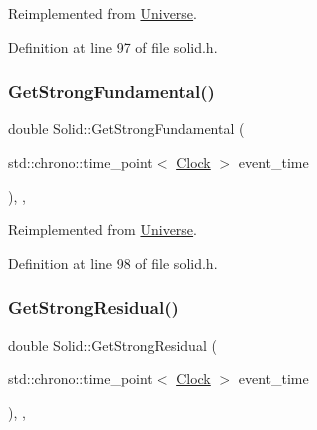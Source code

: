 Reimplemented from \mbox{\hyperlink{class_universe_acb453ce71da418c5b5617fecede9571b}{Universe}}.



Definition at line 97 of file solid.\+h.

\mbox{\label{class_solid_ab3a972354b25ad1bbe8c3f3e7638e24c}} 
\subsubsection{\texorpdfstring{Get\+Strong\+Fundamental()}{GetStrongFundamental()}}
{\footnotesize\ttfamily double Solid\+::\+Get\+Strong\+Fundamental (\begin{DoxyParamCaption}\item[{std\+::chrono\+::time\+\_\+point$<$ \mbox{\hyperlink{universe_8h_a0ef8d951d1ca5ab3cfaf7ab4c7a6fd80}{Clock}} $>$}]{event\+\_\+time }\end{DoxyParamCaption})\hspace{0.3cm}{\ttfamily [inline]}, {\ttfamily [final]}, {\ttfamily [virtual]}}



Reimplemented from \mbox{\hyperlink{class_universe_ab44daccba01ee7e3cf9b50bba83dd19e}{Universe}}.



Definition at line 98 of file solid.\+h.

\mbox{\label{class_solid_a9cfde1c3a4b7c6d2a5a3719d74e27237}} 
\subsubsection{\texorpdfstring{Get\+Strong\+Residual()}{GetStrongResidual()}}
{\footnotesize\ttfamily double Solid\+::\+Get\+Strong\+Residual (\begin{DoxyParamCaption}\item[{std\+::chrono\+::time\+\_\+point$<$ \mbox{\hyperlink{universe_8h_a0ef8d951d1ca5ab3cfaf7ab4c7a6fd80}{Clock}} $>$}]{event\+\_\+time }\end{DoxyParamCaption})\hspace{0.3cm}{\ttfamily [inline]}, {\ttfamily [final]}, {\ttfamily [virtual]}}



